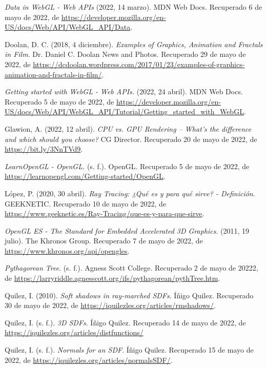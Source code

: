 \begin{thebibliography}{99}
     \textit{Data in WebGL - Web APIs} (2022, 14 marzo). MDN Web Docs. Recuperado 6 de mayo de 2022, de \url{https://developer.mozilla.org/en-US/docs/Web/API/WebGL_API/Data}.

     Doolan, D. C. (2018, 4 diciembre). \textit{Examples of Graphics, Animation and Fractals in Film}. Dr. Daniel C. Doolan News and Photos. Recuperado 29 de mayo de 2022, de \url{https://dcdoolan.wordpress.com/2017/01/23/examples-of-graphics-animation-and-fractals-in-film/}.

     \textit{Getting started with WebGL - Web APIs.} (2022, 24 abril). MDN Web Docs. Recuperado 5 de mayo de 2022, de \url{https://developer.mozilla.org/en-US/docs/Web/API/WebGL_API/Tutorial/Getting_started_with_WebGL}.


     Glawion, A. (2022, 12 abril). \textit{CPU vs. GPU Rendering – What’s the difference and which should you choose?} CG Director. Recuperado 20 de mayo de 2022, de \url{https://bit.ly/3NnTVd9}.

     \textit{LearnOpenGL - OpenGL.} (s. f.). OpenGL. Recuperado 5 de mayo de 2022, de \url{https://learnopengl.com/Getting-started/OpenGL}.

     López, P. (2020, 30 abril). \textit{Ray Tracing: ¿Qué es y para qué sirve? - Definición}. GEEKNETIC. Recuperado 10 de mayo de 2022, de \url{https://www.geeknetic.es/Ray-Tracing/que-es-y-para-que-sirve}.

     \textit{OpenGL ES - The Standard for Embedded Accelerated 3D Graphics}. (2011, 19 julio). The Khronos Group. Recuperado 7 de mayo de 2022, de \url{https://www.khronos.org/api/opengles}.

     \textit{Pythagorean Tree}. (s. f.). Agness Scott College. Recuperado 2 de mayo de 20222, de \url{https://larryriddle.agnesscott.org/ifs/pythagorean/pythTree.htm}.


     Quilez, I. (2010). \textit{Soft shadows in ray-marched SDFs}. Íñigo Quilez. Recuperado 30 de mayo de 2022, de \url{https://iquilezles.org/articles/rmshadows/}.

     Quilez, I. (s. f.). \textit{3D SDFs}. Íñigo Quilez. Recuperado 14 de mayo de 2022, de \url{https://iquilezles.org/articles/distfunctions/}


     Quilez, I. (s. f.). \textit{Normals for an SDF}. Íñigo Quilez. Recuperado 15 de mayo de 2022, de \url{https://iquilezles.org/articles/normalsSDF/}.


\end{thebibliography}
